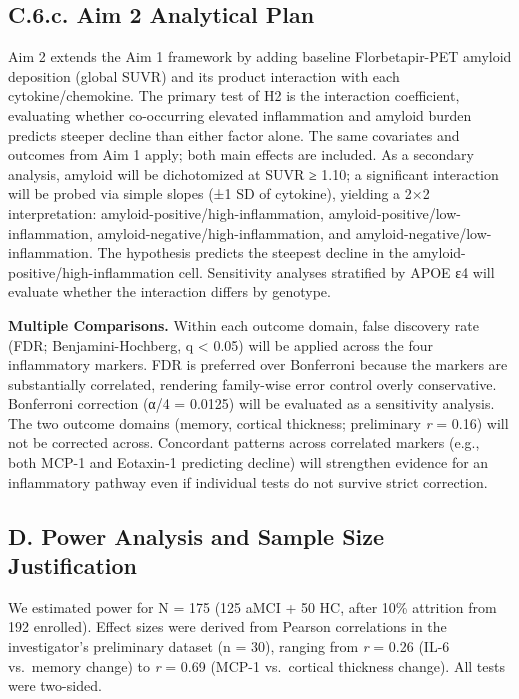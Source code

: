 \documentclass[
]{article}
\begin{document}
\subsection{C.6.c. Aim 2 Analytical
Plan}\label{c.6.c.-aim-2-analytical-plan}

Aim 2 extends the Aim 1 framework by adding baseline Florbetapir-PET
amyloid deposition (global SUVR) and its product interaction with each
cytokine/chemokine. The primary test of H2 is the interaction
coefficient, evaluating whether co-occurring elevated inflammation and
amyloid burden predicts steeper decline than either factor alone. The
same covariates and outcomes from Aim 1 apply; both main effects are
included. As a secondary analysis, amyloid will be dichotomized at SUVR
≥ 1.10; a significant interaction will be probed via simple slopes (±1
SD of cytokine), yielding a 2×2 interpretation:
amyloid-positive/high-inflammation, amyloid-positive/low-inflammation,
amyloid-negative/high-inflammation, and
amyloid-negative/low-inflammation. The hypothesis predicts the steepest
decline in the amyloid-positive/high-inflammation cell. Sensitivity
analyses stratified by APOE ε4 will evaluate whether the interaction
differs by genotype.

\textbf{Multiple Comparisons.} Within each outcome domain, false
discovery rate (FDR; Benjamini-Hochberg, q \textless{} 0.05) will be
applied across the four inflammatory markers. FDR is preferred over
Bonferroni because the markers are substantially correlated, rendering
family-wise error control overly conservative. Bonferroni correction
(α/4 = 0.0125) will be evaluated as a sensitivity analysis. The two
outcome domains (memory, cortical thickness; preliminary \emph{r} =
0.16) will not be corrected across. Concordant patterns across
correlated markers (e.g., both MCP-1 and Eotaxin-1 predicting decline)
will strengthen evidence for an inflammatory pathway even if individual
tests do not survive strict correction.

\subsection{D. Power Analysis and Sample Size
Justification}\label{d.-power-analysis-and-sample-size-justification}

We estimated power for N = 175 (125 aMCI + 50 HC, after 10\% attrition
from 192 enrolled). Effect sizes were derived from Pearson correlations
in the investigator's preliminary dataset (n = 30), ranging from
\textbar{}\emph{r}\textbar{} = 0.26 (IL-6 vs.~memory change) to
\textbar{}\emph{r}\textbar{} = 0.69 (MCP-1 vs.~cortical thickness
change). All tests were two-sided.
\end{document}
